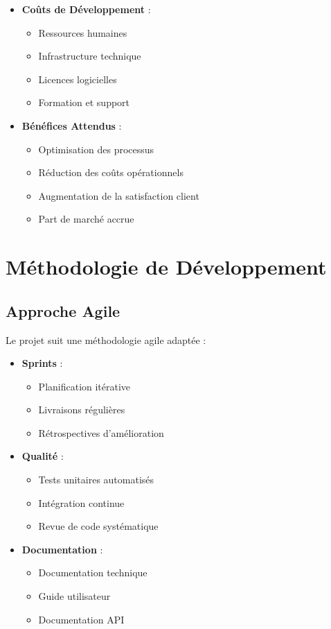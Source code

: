 \begin{itemize}
    \item \textbf{Coûts de Développement} :
    \begin{itemize}
        \item Ressources humaines
        \item Infrastructure technique
        \item Licences logicielles
        \item Formation et support
    \end{itemize}
    
    \item \textbf{Bénéfices Attendus} :
    \begin{itemize}
        \item Optimisation des processus
        \item Réduction des coûts opérationnels
        \item Augmentation de la satisfaction client
        \item Part de marché accrue
    \end{itemize}
\end{itemize}

\section{Méthodologie de Développement}
\subsection{Approche Agile}
Le projet suit une méthodologie agile adaptée :

\begin{itemize}
    \item \textbf{Sprints} :
    \begin{itemize}
        \item Planification itérative
        \item Livraisons régulières
        \item Rétrospectives d'amélioration
    \end{itemize}
    
    \item \textbf{Qualité} :
    \begin{itemize}
        \item Tests unitaires automatisés
        \item Intégration continue
        \item Revue de code systématique
    \end{itemize}
    
    \item \textbf{Documentation} :
    \begin{itemize}
        \item Documentation technique
        \item Guide utilisateur
        \item Documentation API
    \end{itemize}
\end{itemize}

